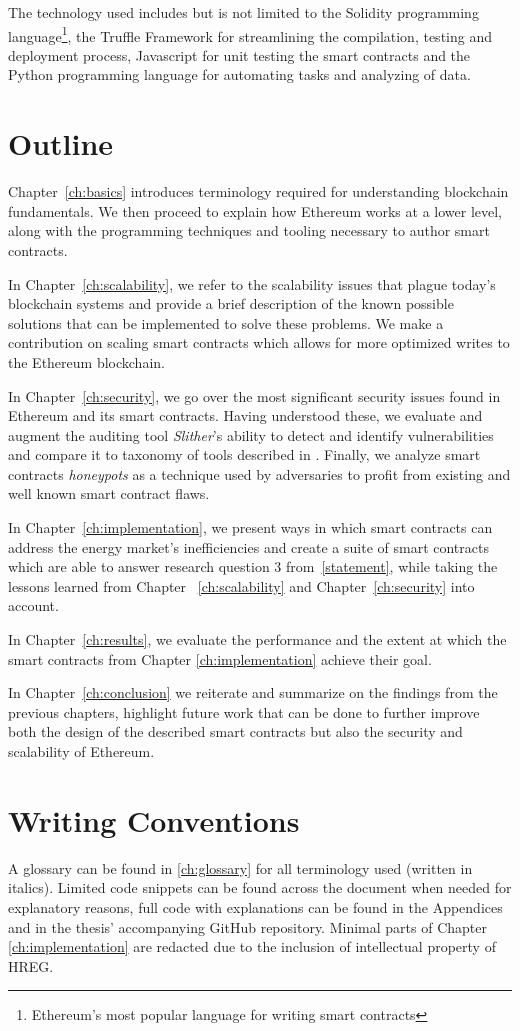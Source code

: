 The technology used includes but is not limited to the Solidity programming language\footnote{Ethereum's most popular language for writing smart contracts}, the Truffle Framework for streamlining the compilation, testing and deployment process, Javascript for unit testing the smart contracts and the Python programming language for automating tasks and analyzing of data.

\section{Outline}

Chapter~\ref{ch:basics} introduces terminology required for understanding blockchain fundamentals. We then proceed to explain how Ethereum works at a lower level, along with the programming techniques and tooling necessary to author smart contracts.

In Chapter~\ref{ch:scalability}, we refer to the scalability issues that plague today's blockchain systems and provide a brief description of the known possible solutions that can be implemented to solve these problems. We make a contribution on scaling smart contracts which allows for more optimized writes to the Ethereum blockchain.

In Chapter~\ref{ch:security}, we go over the most significant security issues found in Ethereum and its smart contracts. Having understood these, we evaluate and augment the auditing tool \textit{Slither}'s ability to detect and identify vulnerabilities and compare it to taxonomy of tools described in \cite{tools}. Finally, we analyze smart contracts \textit{honeypots} as a technique used by adversaries to profit from existing and well known smart contract flaws.

In Chapter~\ref{ch:implementation}, we present ways in which smart contracts can address the energy market's inefficiencies and create a suite of smart contracts which are able to answer research question 3 from~\ref{statement}, while taking the lessons learned from Chapter ~\ref{ch:scalability} and Chapter~\ref{ch:security} into account.

In Chapter~\ref{ch:results}, we evaluate the performance and the extent at which the smart contracts from Chapter \ref{ch:implementation} achieve their goal. 

In Chapter~\ref{ch:conclusion} we reiterate and summarize on the findings from the previous chapters, highlight future work that can be done to further improve both the design of the described smart contracts but also the security and scalability of Ethereum.

\section{Writing Conventions}
A glossary can be found in \ref{ch:glossary} for all terminology used (written in italics). Limited code snippets can be found across the document when needed for explanatory reasons, full code with explanations can be found in the Appendices and in the thesis' accompanying GitHub repository\@. Minimal parts of Chapter \ref{ch:implementation} are redacted due to the inclusion of intellectual property of HREG.
